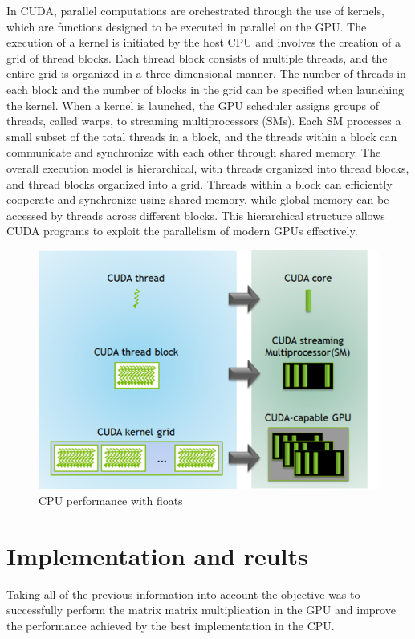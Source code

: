 \documentclass[12p,english]{article}
\begin{document}
In CUDA, parallel computations are orchestrated through the use of kernels, which are functions designed to be executed in parallel on the GPU. The execution of a kernel is initiated by the host CPU and involves the creation of a grid of thread blocks. Each thread block consists of multiple threads, and the entire grid is organized in a three-dimensional manner. The number of threads in each block and the number of blocks in the grid can be specified when launching the kernel.
When a kernel is launched, the GPU scheduler assigns groups of threads, called warps, to streaming multiprocessors (SMs). Each SM processes a small subset of the total threads in a block, and the threads within a block can communicate and synchronize with each other through shared memory.
The overall execution model is hierarchical, with threads organized into thread blocks, and thread blocks organized into a grid. Threads within a block can efficiently cooperate and synchronize using shared memory, while global memory can be accessed by threads across different blocks. This hierarchical structure allows CUDA programs to exploit the parallelism of modern GPUs effectively.

\begin{figure}[h]
\centering
\includegraphics[scale= 0.6]{CUDA.png}
\caption{CPU performance with floats}
\end{figure}



\section{Implementation and reults}
Taking all of the previous information into account the objective was to successfully perform the matrix matrix multiplication in the GPU and improve the performance achieved by the best implementation in the CPU.
\end{document}
